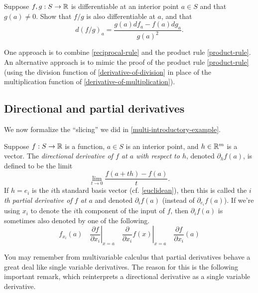 \begin{exercise} \label{quotient-rule} 
	Suppose $f, g : S \to \mathbb{R}$ is differentiable at an interior point $a \in S$ and that $g(a) \neq 0$. Show that $f/g$ is also differentiable at $a$, and that
	\[ d(f/g)_a = \frac{g(a)df_a - f(a)dg_a}{g(a)^2}. \]
	\begin{hint}
		One approach is to combine \cref{reciprocal-rule} and the product rule \ref{product-rule}. An alternative approach is to mimic the proof of the product rule \ref{product-rule} (using the division function of \cref{derivative-of-division} in place of the multiplication function of  \cref{derivative-of-multiplication}). 
	\end{hint}
\end{exercise}

\subsection{Directional and partial derivatives}

We now formalize the ``slicing'' we did in \cref{multi-introductory-example}. 

\begin{definition}  
	Suppose $f : S \to \mathbb{R}$ is a function, $a \in S$ is an interior point, and $h \in \mathbb{R}^m$ is a vector. The \emph{directional derivative of $f$ at $a$ with respect to $h$}, denoted $\partial_h f(a)$, is defined to be the limit
	\[ \lim_{t \to 0} \frac{f(a+th) - f(a)}{t}. \]
	If $h = e_i$ is the $i$th standard basis vector (cf. \cref{euclidean}), then this is called the \emph{$i$th partial derivative of $f$ at $a$} and denoted $\partial_i f(a)$ (instead of $\partial_{e_i} f(a)$). If we're using $x_i$ to denote the $i$th component of the input of $f$, then $\partial_i f(a)$ is sometimes also denoted by one of the following. 
	\[ f_{x_i}(a) \quad \left. \frac{\partial f}{\partial x_i}\right|_{x = a} \quad \left.\frac{\partial}{\partial x_i} f(x)\right|_{x = a} \quad \frac{\partial f}{\partial x_i}(a) \]
\end{definition}

You may remember from multivariable calculus that partial derivatives behave a great deal like single variable derivatives. The reason for this is the following important remark, which reinterprets a directional derivative as a single variable derivative. 

